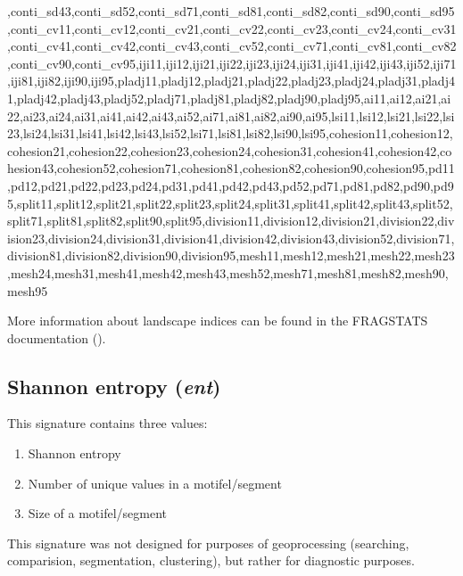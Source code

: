 ,conti_sd43,conti_sd52,conti_sd71,conti_sd81,conti_sd82,conti_sd90,conti_sd95,conti_cv11,conti_cv12,conti_cv21,conti_cv22,conti_cv23,conti_cv24,conti_cv31,conti_cv41,conti_cv42,conti_cv43,conti_cv52,conti_cv71,conti_cv81,conti_cv82,conti_cv90,conti_cv95,iji11,iji12,iji21,iji22,iji23,iji24,iji31,iji41,iji42,iji43,iji52,iji71,iji81,iji82,iji90,iji95,pladj11,pladj12,pladj21,pladj22,pladj23,pladj24,pladj31,pladj41,pladj42,pladj43,pladj52,pladj71,pladj81,pladj82,pladj90,pladj95,ai11,ai12,ai21,ai22,ai23,ai24,ai31,ai41,ai42,ai43,ai52,ai71,ai81,ai82,ai90,ai95,lsi11,lsi12,lsi21,lsi22,lsi23,lsi24,lsi31,lsi41,lsi42,lsi43,lsi52,lsi71,lsi81,lsi82,lsi90,lsi95,cohesion11,cohesion12,cohesion21,cohesion22,cohesion23,cohesion24,cohesion31,cohesion41,cohesion42,cohesion43,cohesion52,cohesion71,cohesion81,cohesion82,cohesion90,cohesion95,pd11,pd12,pd21,pd22,pd23,pd24,pd31,pd41,pd42,pd43,pd52,pd71,pd81,pd82,pd90,pd95,split11,split12,split21,split22,split23,split24,split31,split41,split42,split43,split52,split71,split81,split82,split90,split95,division11,division12,division21,division22,division23,division24,division31,division41,division42,division43,division52,division71,division81,division82,division90,division95,mesh11,mesh12,mesh21,mesh22,mesh23,mesh24,mesh31,mesh41,mesh42,mesh43,mesh52,mesh71,mesh81,mesh82,mesh90,mesh95



More information about landscape indices can be found in the FRAGSTATS documentation (\cite{mcgarigal2014fragstats}).

% 

\subsection{Shannon entropy ({\it ent})}

This signature contains three values:

\begin{enumerate}
  \item Shannon entropy
  \item Number of unique values in a motifel/segment
  \item Size of a motifel/segment
\end{enumerate}

This signature was not designed for purposes of geoprocessing (searching, comparision, segmentation, clustering), but rather for diagnostic purposes.